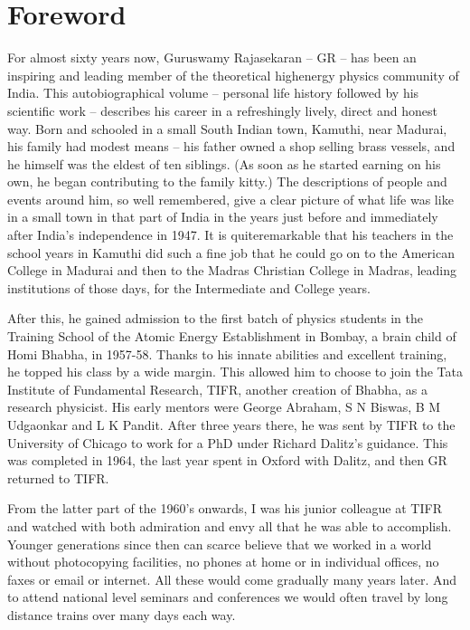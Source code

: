 \chapter*{Foreword}


For almost sixty years now, Guruswamy Rajasekaran – GR – has been an 
inspiring and leading member of the theoretical high\break energy physics 
community of India. This autobiographical volume – personal life 
history followed by his scientific work – describes his career in a 
refreshingly lively, direct and honest way. Born and schooled in a 
small South Indian town, Kamuthi, near Madurai, his family had modest 
means – his father owned a shop selling brass vessels, and he himself 
was the eldest of ten siblings. (As soon as he started earning on his 
own, he began contributing to the family kitty.) The descriptions of 
people and events around him, so well remembered, give a clear picture 
of what life was like in a small town in that part of India in the 
years just before and immediately after India’s independence in 1947. It 
is quite\break remarkable that his teachers in the school years in Kamuthi 
did such a fine job that he could go on to the American College in 
Madurai and then to the Madras Christian College in Madras, leading 
institutions of those days, for the Intermediate and Colleg\-e years.

After this, he gained admission to the first batch of physics studen\-ts 
in the Training School of the Atomic Energy Establish\-ment in Bombay, a 
brain child of Homi Bhabha, in 1957-58. Thanks to his innate abilities 
and excellent training, he topped his class by a wide margin. This 
allowed him to choose to join the Tata Institute of Fundamental 
Research, TIFR, another crea\-tion of Bhabha, as a research physicist. 
His early mentors were George Abraham, S N Biswas, B M Udgaonkar and L 
K Pandit. After three years there, he was sent by TIFR to the 
University of Chicago to work for a PhD under Richard Dalitz’s 
guidance. This was completed in 1964, the last year spent in Oxford 
with Dalitz, and then GR returned to TIFR.
\eject

From the latter part of the 1960’s onwards, I was his junior colleague 
at TIFR and watched with both admiration and envy all that he was able 
to accomplish. Younger generations since then can scarce believe that 
we worked in a world without photocopying facilities, no phones at home 
or in individual offices, no faxes or email or internet. All these 
would come gradually many years later. And to attend national level 
seminars and conferences we would often travel by long distance trains 
over many days each way.

